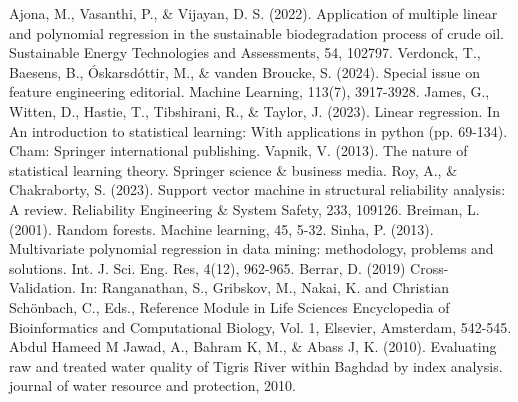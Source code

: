 \documentclass[12pt,a4paper]{article}
\begin{document}
\begin{enumerate}
\begin{thebibliography}{99}
 Ajona, M., Vasanthi, P., \& Vijayan, D. S. (2022). Application of multiple linear and polynomial regression in the sustainable biodegradation process of crude oil. Sustainable Energy Technologies and Assessments, 54, 102797.
 Verdonck, T., Baesens, B., Óskarsdóttir, M., \& vanden Broucke, S. (2024). Special issue on feature engineering editorial. Machine Learning, 113(7), 3917-3928.
 James, G., Witten, D., Hastie, T., Tibshirani, R., \& Taylor, J. (2023). Linear regression. In An introduction to statistical learning: With applications in python (pp. 69-134). Cham: Springer international publishing.
 Vapnik, V. (2013). The nature of statistical learning theory. Springer science \& business media.
 Roy, A., \& Chakraborty, S. (2023). Support vector machine in structural reliability analysis: A review. Reliability Engineering \& System Safety, 233, 109126.
 Breiman, L. (2001). Random forests. Machine learning, 45, 5-32.
 Sinha, P. (2013). Multivariate polynomial regression in data mining: methodology, problems and solutions. Int. J. Sci. Eng. Res, 4(12), 962-965.
 Berrar, D. (2019) Cross-Validation. In: Ranganathan, S., Gribskov, M., Nakai, K. and Christian Schönbach, C., Eds., Reference Module in Life Sciences Encyclopedia of Bioinformatics and Computational Biology, Vol. 1, Elsevier, Amsterdam, 542-545.
 Abdul Hameed M Jawad, A., Bahram K, M., \& Abass J, K. (2010). Evaluating raw and treated water quality of Tigris River within Baghdad by index analysis. journal of water resource and protection, 2010.
\end{thebibliography}

\end{enumerate}

\label{LastPage}
\end{document}
